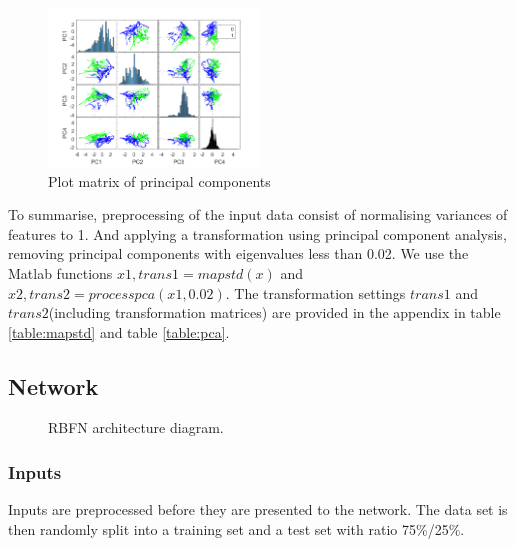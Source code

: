 \documentclass[a4paper, 11pt]{article}
\begin{document}
\begin{figure}[h]
  	\centering
    \includegraphics[width=0.5\textwidth]{../figures/pca_plotmatrix.png}
    \caption{Plot matrix of principal components}
	\label{fig:pca_plotmatrix}
\end{figure}


To summarise, preprocessing of the input data consist of normalising variances of features to 1. And applying a transformation using principal component analysis, removing principal components with eigenvalues less than 0.02. We use the Matlab functions $x1, trans1 = mapstd(x)$ and $x2, trans2 = processpca(x1, 0.02)$. The transformation settings $trans1$ and $trans2$(including transformation matrices) are provided in the appendix in table \ref{table:mapstd} and table \ref{table:pca}.
  


\subsection{Network}
\begin{figure}[h]
\centering
  \caption{RBFN architecture diagram.}
  \label{fig:architecture}
\end{figure}

\subsubsection{Inputs}
Inputs are preprocessed before they are presented to the network. The data set is then randomly split into a training set and a test set with ratio 75\%/25\%.
\end{document}
